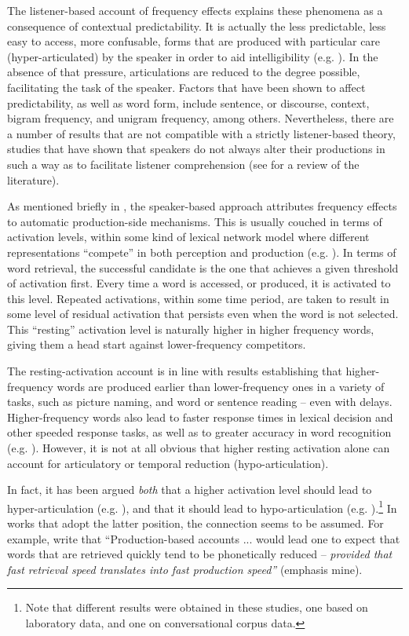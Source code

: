 The listener-based account of frequency effects explains these phenomena
as a consequence of contextual predictability. It is actually the
less predictable, less easy to access, more confusable, forms that
are produced with particular care (hyper-articulated) by the speaker
in order to aid intelligibility (e.g. \citealt{Aylett2004}). In
the absence of that pressure, articulations are reduced to the degree
possible, facilitating the task of the speaker. Factors that have
been shown to affect predictability, as well as word form, include
sentence, or discourse, context, bigram frequency, and unigram frequency,
among others. Nevertheless, there are a number of results that are
not compatible with a strictly listener-based theory, studies that
have shown that speakers do not always alter their productions in
such a way as to facilitate listener comprehension (see \citealt{turnbull2015assessing}
for a review of the literature).

As mentioned briefly in , the
speaker-based approach attributes frequency effects to automatic production-side
mechanisms. This is usually couched in terms of activation levels,
within some kind of lexical network model where different representations
“compete” in both perception and production (e.g. \citealp{mcclelland1981interactive,Dell1986}).
In terms of word retrieval, the successful candidate is the one that
achieves a given threshold of activation first. Every time a word
is accessed, or produced, it is activated to this level. Repeated
activations, within some time period, are taken to result in some
level of residual activation that persists even when the word is not
selected. This “resting” activation level is naturally higher
in higher frequency words, giving them a head start against lower-frequency
competitors. 

The resting-activation account is in line with results establishing
that higher-frequency words are produced earlier than lower-frequency
ones in a variety of tasks, such as picture naming, and word or sentence
reading – even with delays. Higher-frequency words also lead to faster
response times in lexical decision and other speeded response tasks,
as well as to greater accuracy in word recognition (e.g. \citealt{howes1951visual,balota1985locus,Luce1986,Marslen-Wilson1990}).
However, it is not at all obvious that higher resting activation alone
can account for articulatory or temporal reduction (hypo-articulation).

In fact, it has been argued \emph{both} that a higher activation level
should lead to hyper-articulation (e.g. \citealt{Baese-Berk2009}),
and that it should lead to hypo-articulation (e.g. \citealt{gahl2012reduce}).\footnote{Note that different results were obtained in these studies, one based
on laboratory data, and one on conversational corpus data.} In works that adopt the latter position, the connection seems to
be assumed. For example, \citet[79]{gahl2012reduce}
write that “Production-based accounts ... would lead one to expect
that words that are retrieved quickly tend to be phonetically reduced
– \emph{provided that fast retrieval speed translates into fast production
speed”} (emphasis mine).

